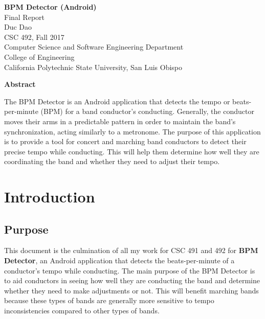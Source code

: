 \documentclass[12pt]{article}
\begin{document}
\begin{center}
  \vspace*{1in}
  \textbf{\LARGE{BPM Detector (Android)}} \\
  \large{Final Report \\
  Duc Dao \\
  CSC 492, Fall 2017 \\
  Computer Science and Software Engineering Department \\
  College of Engineering\\
  California Polytechnic State University, San Luis Obispo} \\
\end{center}

\begin{center}
  \vspace*{2in}
  \textbf{Abstract} \\
\end{center}
The BPM Detector is an Android application that detects the tempo or beats-per-minute (BPM) for a band conductor's conducting. Generally, the conductor moves their arms in a predictable pattern in order to maintain the band's synchronization, acting similarly to a metronome. The purpose of this application is to provide a tool for concert and marching band conductors to detect their precise tempo while conducting. This will help them determine how well they are coordinating the band and whether they need to adjust their tempo.  

\newpage

\tableofcontents

\newpage

\section{Introduction}
\subsection{Purpose}
This document is the culmination of all my work for CSC 491 and 492 for \textbf{BPM Detector}, an Android application that detects the beats-per-minute of a conductor's tempo while conducting. The main purpose of the BPM Detector is to aid conductors in seeing how well they are conducting the band and determine whether they need to make adjustments or not. This will benefit marching bands because these types of bands are generally more sensitive to tempo inconsistencies compared to other types of bands.
\end{document}
